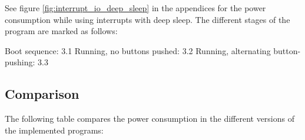 See figure \ref{fig:interrupt_io_deep_sleep} in the appendices for the power consumption while using interrupts with deep sleep. The different stages of the program are marked as follows:

Boot sequence: 3.1
Running, no buttons pushed: 3.2
Running, alternating button-pushing: 3.3

\subsection{Comparison}

The following table compares the power consumption in the different versions of the implemented programs:


